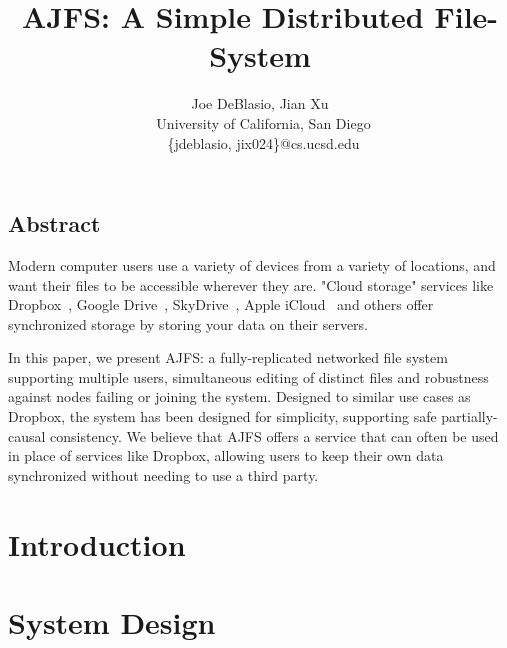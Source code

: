 \documentclass[letterpaper,twocolumn,10pt]{article}
\begin{document}

\date{}

\title{\Large \bf AJFS: A Simple Distributed File-System}

\author{
    {\rm Joe DeBlasio, Jian Xu}\\\
    University of California, San Diego\\\
    \{jdeblasio, jix024\}@cs.ucsd.edu}

\maketitle

\thispagestyle{empty}

\subsection*{Abstract}
    Modern computer users use a variety of devices from a variety of locations,
and want their files to be accessible wherever they are. "Cloud storage"
services like Dropbox~\cite{Dropbox}, Google Drive~\cite{googledrive}, SkyDrive~\cite{skydrive}, Apple iCloud~\cite{icloud} and others offer
synchronized storage by storing your data on their servers.

    In this paper, we present AJFS: a fully-replicated networked file system
supporting multiple users, simultaneous editing of distinct files and robustness
against nodes failing or joining the system. Designed to similar use cases as
Dropbox, the system has been designed for simplicity, supporting safe
partially-causal consistency. We believe that AJFS offers a service that can
often be used in place of services like Dropbox, allowing users to keep their
own data synchronized without needing to use a third party.

\section{Introduction}
\label{sec:introduction}


\section{System Design}
\label{sec:designOverview}

\end{document}
